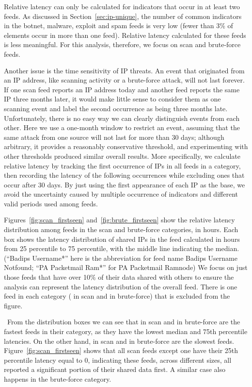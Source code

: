 Relative latency can only be calculated for
indicators that occur in at least two feeds. As discussed in
Section~\ref{sec:ip-unique}, the number of common indicators in the botnet, malware, exploit and spam feeds is very low (fewer than 3\% of elements occur in more than one feed). Relative latency calculated for these feeds is less meaningful. For this analysis, therefore, we focus on scan and brute-force feeds.

Another issue is the time sensitivity of IP threats. An event that originated from
an IP address, like scanning activity or a brute-force attack, will not last
forever. If one scan feed reports an IP address today and another feed reports
the same IP three months later, it would make little sense to consider them as one
scanning event and label the second occurrence as being three months late.
Unfortunately, there is no easy way we can clearly distinguish events from each
other. Here we use a one-month window to restrict an event, assuming that the same
attack from one source will not last for more than 30 days; although arbitrary, it provides a reasonably conservative threshold, and experimenting with other thresholds produced similar overall results. More specifically, we calculate relative latency by tracking the
first occurrence of IPs in all feeds in a category, then recording the latency of the
following occurrences while excluding ones that occur after 30 days. By just
using the first appearance of each IP as the base, we avoid the uncertainty caused by
multiple occurrence of indicators and different valid periods used among feeds.


Figures~\ref{fig:scan_firstseen} and~\ref{fig:brute_firstseen} show the relative
latency distribution among feeds in the scan and brute-force categories, in hours. Each box shows the latency distribution of shared IPs in the feed calculated in hours
from 25 percentile to 75 percentile, with the middle line indicating the median.
(``Badips Username*'' here is the abbreviation for feed name Badips
Username Notfound; ``PA Packetmail Ram*'' for PA Packetmail Ramnode)
We focus on just those feeds that have
over 10\% of their data shared with others to ensure the analysis can represent the latency
distribution of the overall feed. There is one feed in each category ({\feedTSSnort}
in scan and {\feedTSBrute} in brute-force) that is excluded from the figure.

\finding\
From the distribution boxes we can see that {\feedetiprep} in scan and {\feedbadipssh}
in brute-force are the fastest feeds in their category, as they have the lowest median
and 75th percentile latencies. On the other hand, {\feedTSAnalyst} in scan and
{\feedbadipbot} in brute-force are the slowest feeds. Figure~\ref{fig:scan_firstseen}
shows that all scan feeds except one have their 25th percentile latency equal to 0, indicating
these feeds, across different sizes, all reported a significant portion of their shared
data first. A similar case also happens in the brute-force category.

